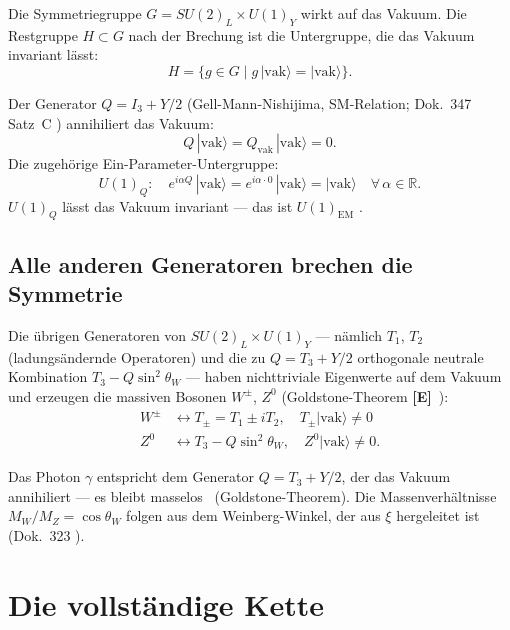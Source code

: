 Die Symmetriegruppe $G = SU(2)_L\times U(1)_Y$ wirkt auf das Vakuum.
Die Restgruppe $H\subset G$ nach der Brechung ist die Untergruppe, die
das Vakuum invariant lässt:
\begin{equation}
  H = \{g\in G \mid g\,|\text{vak}\rangle = |\text{vak}\rangle\}.
  \label{eq:residual}
\end{equation}

Der Generator $Q = I_3 + Y/2$ (Gell-Mann-Nishijima, SM-Relation; Dok.~347 Satz~C \SM)
annihiliert das Vakuum:
\begin{equation}
  Q\,|\text{vak}\rangle = Q_\text{vak}\,|\text{vak}\rangle = 0.
  \label{eq:Q_annihilates}
\end{equation}
Die zugehörige Ein-Parameter-Untergruppe:
\begin{equation}
  U(1)_Q : \quad e^{i\alpha Q}\,|\text{vak}\rangle
  = e^{i\alpha\cdot 0}\,|\text{vak}\rangle = |\text{vak}\rangle
  \quad\forall\,\alpha\in\mathbb{R}.
  \label{eq:u1_invariant}
\end{equation}
$U(1)_Q$ lässt das Vakuum invariant --- das ist $U(1)_\text{EM}$ \BM.

\subsection*{Alle anderen Generatoren brechen die Symmetrie}

Die übrigen Generatoren von $SU(2)_L\times U(1)_Y$ --- nämlich $T_1$, $T_2$
(ladungsändernde Operatoren) und die zu $Q = T_3 + Y/2$ orthogonale neutrale
Kombination $T_3 - Q\sin^2\theta_W$ ---
haben nichttriviale Eigenwerte auf dem Vakuum und erzeugen die massiven
Bosonen $W^\pm$, $Z^0$ (Goldstone-Theorem \textbf{[E]}\ \QM):
\begin{align}
  W^\pm &\leftrightarrow T_\pm = T_1 \pm iT_2, \quad
    T_\pm|\text{vak}\rangle \neq 0 \label{eq:W}\\
  Z^0 &\leftrightarrow T_3 - Q\sin^2\theta_W, \quad
    Z^0|\text{vak}\rangle \neq 0. \label{eq:Z}
\end{align}

Das Photon $\gamma$ entspricht dem Generator $Q = T_3 + Y/2$, der das
Vakuum annihiliert --- es bleibt masselos \BM\ (Goldstone-Theorem).
Die Massenverhältnisse $M_W/M_Z = \cos\theta_W$ folgen aus dem
Weinberg-Winkel, der aus $\xi$ hergeleitet ist (Dok.~323 \KM).

\section{Die vollständige Kette}

